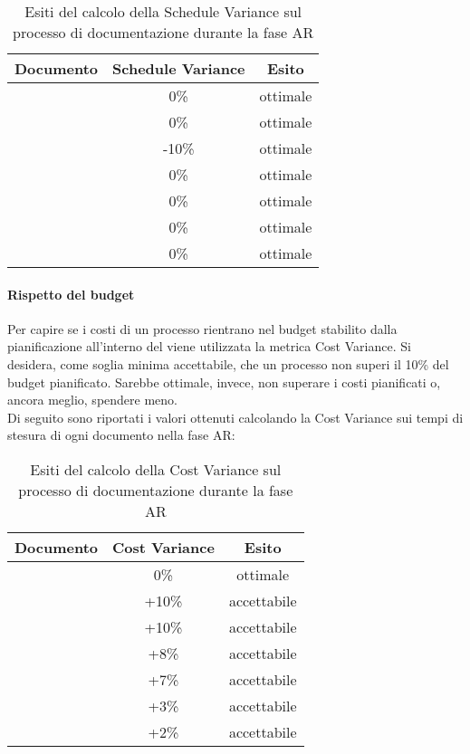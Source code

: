 \documentclass[PianoDiQualifica.tex]{subfiles}
\begin{document}
			\begin{table}[h]
				\centering
				\begin{tabular}{l c c}
					\hline
					\rule[-0.3cm]{0cm}{0.8cm}
					\textbf{Documento} & \textbf{Schedule Variance} & \textbf{Esito} \\
					\hline
					\rule[0cm]{0cm}{0.4cm}
					\PPdocRR & 0\% & ottimale \\
					\rule[0cm]{0cm}{0.4cm}
					\NPdocRR & 0\% & ottimale\\ 
					\rule[0cm]{0cm}{0.4cm}
					\ARdocRR & -10\% & ottimale\\ 
					\rule[0cm]{0cm}{0.4cm}
					\PQdocRR & 0\% & ottimale \\ 
					\rule[0cm]{0cm}{0.4cm}
					\Gldoc & 0\% & ottimale \\ 
					\rule[0cm]{0cm}{0.4cm}
					\SDKdoc & 0\% & ottimale \\ 
					\rule[0cm]{0cm}{0.4cm}
					\SFdocRR & 0\% & ottimale\\ 
					\hline
				\end{tabular}
				\caption{Esiti del calcolo della Schedule Variance sul processo di documentazione durante la fase AR}
			\end{table}
		\paragraph{Rispetto del budget}
		Per capire se i costi di un processo rientrano nel budget stabilito dalla pianificazione all'interno del 				\PPdocRR{} viene utilizzata la metrica Cost Variance. Si desidera, come soglia minima accettabile, che un 				processo non superi il 10\% del budget pianificato. Sarebbe ottimale, invece, non superare i costi pianificati 			o, ancora meglio, spendere meno.\\
		Di seguito sono riportati i valori ottenuti calcolando la Cost Variance sui tempi di stesura di ogni 				documento nella fase AR:\\
\begin{table}[h]
				\centering
				\begin{tabular}{l c c}
					\hline
					\rule[-0.3cm]{0cm}{0.8cm}
					\textbf{Documento} & \textbf{Cost Variance} & \textbf{Esito} \\
					\hline
					\rule[0cm]{0cm}{0.4cm}
					\PPdocRR & 0\% & ottimale \\
					\rule[0cm]{0cm}{0.4cm}
					\NPdocRR & +10\% & accettabile \\ 
					\rule[0cm]{0cm}{0.4cm}
					\ARdocRR & +10\% & accettabile \\ 
					\rule[0cm]{0cm}{0.4cm}
					\PQdocRR & +8\% & accettabile \\ 
					\rule[0cm]{0cm}{0.4cm}
					\Gldoc & +7\% & accettabile\\ 
					\rule[0cm]{0cm}{0.4cm}
					\SDKdoc & +3\% & accettabile \\ 
					\rule[0cm]{0cm}{0.4cm}
					\SFdocRR & +2\% & accettabile\\ 
					\hline
				\end{tabular}
				\caption{Esiti del calcolo della Cost Variance sul processo di documentazione durante la fase AR}
			\end{table}	
			
\end{document}
